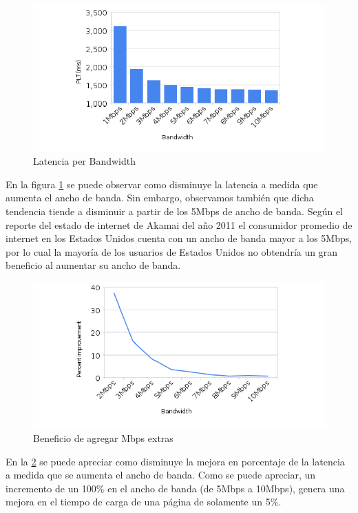 \begin{figure}[h!]
\centering
\includegraphics[width=1\textwidth]{figuras/latencyperbandwidth.png}
	\caption{Latencia per Bandwidth}
    \label{fig.latency-per-bandwidth}
\end{figure}

En la figura \ref{fig.latency-per-bandwidth} se puede observar como disminuye la latencia a medida que aumenta el ancho de banda. Sin embargo, observamos también que dicha tendencia tiende a disminuir a partir de los 5Mbps de ancho de banda.
Según el reporte del estado de internet de Akamai del año 2011 \cite{akamai} el consumidor promedio de internet en los Estados Unidos cuenta con un ancho de banda mayor a los 5Mbps, por lo cual la mayoría de los usuarios de Estados Unidos no obtendría un gran beneficio al aumentar su ancho de banda.

\begin{figure}[h!]
\centering
\includegraphics[width=1\textwidth]{figuras/beneficiodembpsextras.png}
	\caption{Beneficio de agregar Mbps extras}
    \label{fig.beneficioextrambps}
\end{figure}

En la \ref{fig.beneficioextrambps} se puede apreciar como disminuye la mejora en porcentaje de la latencia a medida que se aumenta el ancho de banda. Como se puede apreciar,
un incremento de un 100\% en el ancho de banda (de 5Mbps a 10Mbps), genera una mejora en el tiempo de carga de una página de solamente un 5\%.

